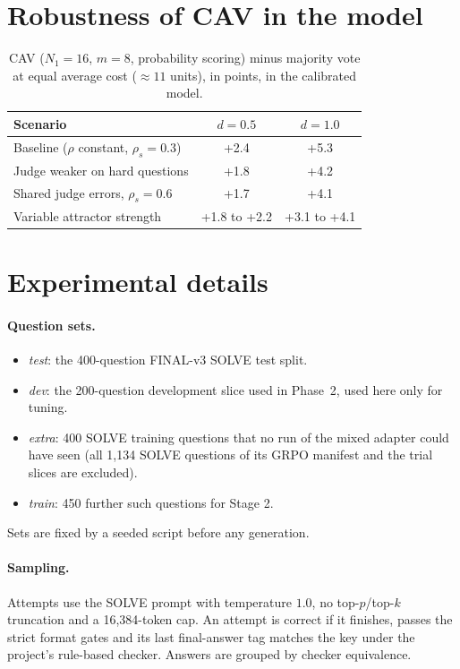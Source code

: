 \section{Robustness of CAV in the model}
\label{app:robust}

\begin{table}[h]
\centering\small
\begin{tabular}{@{}lcc@{}}
\toprule
Scenario & $d=0.5$ & $d=1.0$ \\
\midrule
Baseline ($\rho$ constant, $\rho_s=0.3$) & +2.4 & +5.3 \\
Judge weaker on hard questions & +1.8 & +4.2 \\
Shared judge errors, $\rho_s=0.6$ & +1.7 & +4.1 \\
Variable attractor strength & +1.8 to +2.2 & +3.1 to +4.1 \\
\bottomrule
\end{tabular}
\caption{CAV ($N_1=16$, $m=8$, probability scoring) minus majority vote at equal average cost ($\approx11$ units), in
points, in the calibrated model.}
\end{table}

\section{Experimental details}
\label{app:details}

\paragraph{Question sets.}
\begin{itemize}
\item \emph{test}: the 400-question FINAL-v3 SOLVE test split.
\item \emph{dev}: the 200-question development slice used in Phase~2, used here only for tuning.
\item \emph{extra}: 400 SOLVE training questions that no run of the mixed adapter could have seen (all 1,134 SOLVE
  questions of its GRPO manifest and the trial slices are excluded).
\item \emph{train}: 450 further such questions for Stage 2.
\end{itemize}
Sets are fixed by a seeded script before any generation.

\paragraph{Sampling.}
Attempts use the SOLVE prompt with temperature $1.0$, no top-$p$/top-$k$ truncation and a 16,384-token cap. An attempt is
correct if it finishes, passes the strict format gates and its last final-answer tag matches the key under the
project's rule-based checker. Answers are grouped by checker equivalence.

